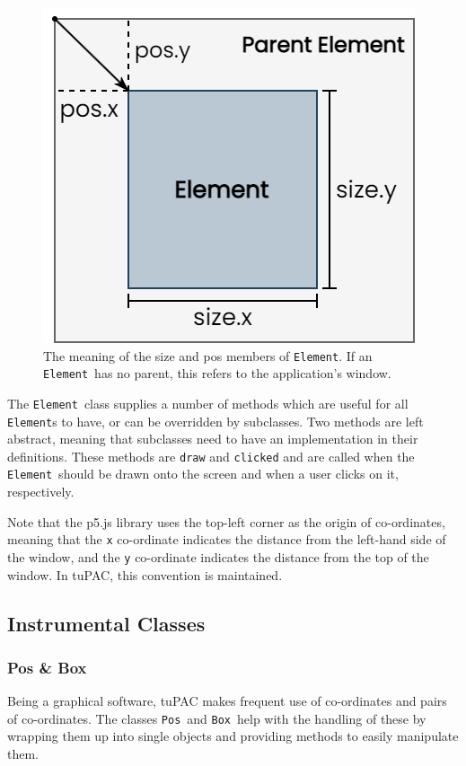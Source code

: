 \documentclass[12pt,a4paper,oneside,openright]{report}
\newcommand{\element}{\texttt{Element}}
\newcommand{\pos}{\texttt{Pos}}
\newcommand{\boxT}{\texttt{Box}}
\begin{document}
\begin{figure}[h]
    \centering
    \includegraphics[scale=0.6]{images/element_demonstration.png}
    \caption{The meaning of the size and pos members of \element. If an \element\ has no parent, this refers to the application's window.}
    \label{fig:element_demo}
\end{figure}

The \element\ class supplies a number of methods which are useful for all \element s to have, or can be overridden by subclasses. Two methods are left abstract, meaning that subclasses need to have an implementation in their definitions. These methods are \verb|draw| and \verb|clicked| and are called when the \element\ should be drawn onto the screen and when a user clicks on it, respectively.

Note that the p5.js library uses the top-left corner as the origin of co-ordinates, meaning that the \verb|x| co-ordinate indicates the distance from the left-hand side of the window, and the \verb|y| co-ordinate indicates the distance from the top of the window. In tuPAC, this convention is maintained.

\subsection{Instrumental Classes}
\subsubsection{Pos \& Box}\label{sec:pos}
Being a graphical software, tuPAC makes frequent use of co-ordinates and pairs of co-ordinates. The classes \pos\ and \boxT\ help with the handling of these by wrapping them up into single objects and providing methods to easily manipulate them.
\end{document}
